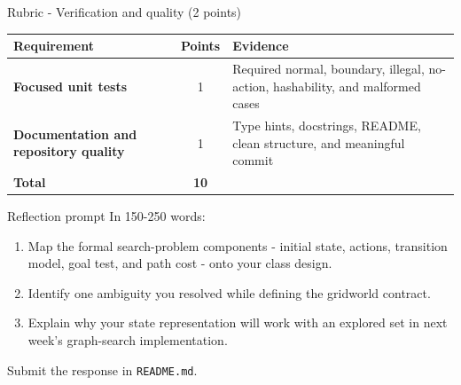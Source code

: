 \documentclass[aspectratio=169,11pt]{beamer}
\begin{document}
\begin{frame}{Rubric - Verification and quality (2 points)}
  \scriptsize
  \begin{tabularx}{\textwidth}{>{\bfseries}p{} c X}
    \toprule
    Requirement & Points & Evidence \\
    \midrule
    Focused unit tests & 1 & Required normal, boundary, illegal, no-action,
      hashability, and malformed cases \\
    Documentation and repository quality & 1 & Type hints, docstrings, README,
      clean structure, and meaningful commit \\
    \midrule
    \textbf{Total} & \textbf{10} & \\
    \bottomrule
  \end{tabularx}
\end{frame}

\begin{frame}{Reflection prompt}
  In 150-250 words:

  \vspace{0.35cm}
  \begin{enumerate}
    \item Map the formal search-problem components - initial state, actions,
      transition model, goal test, and path cost - onto your class design.
    \item Identify one ambiguity you resolved while defining the gridworld contract.
    \item Explain why your state representation will work with an explored set
      in next week's graph-search implementation.
  \end{enumerate}

  \vspace{0.3cm}
  Submit the response in \texttt{README.md}.
\end{frame}
\end{document}
